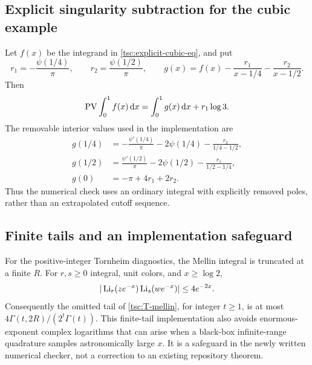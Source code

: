 \subsection{Explicit singularity subtraction for the cubic example}
Let $f(x)$ be the integrand in \eqref{tsc:explicit-cubic-eq}, and put
\[
 r_1=-\frac{\psi(1/4)}\pi,\qquad r_2=\frac{\psi(1/2)}\pi,
 \qquad g(x)=f(x)-\frac{r_1}{x-1/4}-\frac{r_2}{x-1/2}.
\]
Then
\begin{equation}\label{tsc:cubic-numeric}
 \operatorname{PV}\int_0^1 f(x)\,\mathrm d x=\int_0^1g(x)\,\mathrm d x+r_1\log3.
\end{equation}
The removable interior values used in the implementation are
\begin{align*}
 g(1/4)&=-\frac{\psi'(1/4)}\pi-2\psi(1/4)
                         -\frac{r_2}{1/4-1/2},\\
 g(1/2)&=\frac{\psi'(1/2)}\pi-2\psi(1/2)
                         -\frac{r_1}{1/2-1/4},\\
 g(0)&=-\pi+4r_1+2r_2.
\end{align*}
Thus the numerical check uses an ordinary integral with explicitly removed
poles, rather than an extrapolated cutoff sequence.

\subsection{Finite tails and an implementation safeguard}
For the positive-integer Tornheim diagnostics, the Mellin integral is
truncated at a finite $R$. For $r,s\ge0$ integral, unit colors, and
$x\ge\log2$,
\[
 |\operatorname{Li}_r(ze^{-x})\operatorname{Li}_s(we^{-x})|\le4e^{-2x}.
\]
Consequently the omitted tail of \eqref{tsc:T-mellin}, for integer $t\ge1$,
is at most $4\Gamma(t,2R)/(2^t\Gamma(t))$. This finite-tail implementation
also avoids enormous-exponent complex logarithms that can arise when a
black-box infinite-range quadrature samples astronomically large $x$.
It is a safeguard in the newly written numerical checker, not a correction
to an existing repository theorem.

